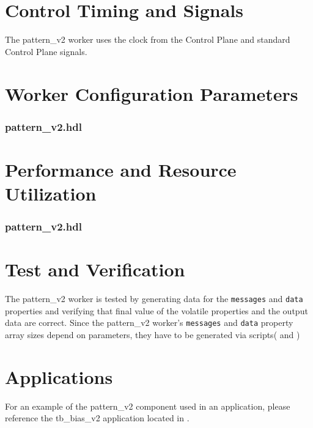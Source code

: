 \documentclass{article}
\def\comp{pattern\_v2}
\edef\ecomp{pattern_v2}
\begin{document}
\section*{Control Timing and Signals}
\begin{flushleft}
The {\comp} worker uses the clock from the Control Plane and standard Control Plane signals.
\end{flushleft}

\begin{landscape}
\section*{Worker Configuration Parameters}
\subsubsection*{\comp.hdl}

\section*{Performance and Resource Utilization}
\subsubsection*{\comp.hdl}

\end{landscape}


\section*{Test and Verification}
\normalsize

\begin{flushleft}

The {\comp} worker is tested by generating data for the \texttt{messages} and \texttt{data} properties and verifying that final value of the volatile properties and the output data are correct. Since the {\comp} worker's \texttt{messages} and \texttt{data} property array sizes depend on parameters, they have to be generated via scripts( and )
\newline


\end{flushleft}

\section*{Applications}
\begin{flushleft}

For an example of the {\comp} component used in an application, please reference the
tb\_bias\_v2 application located in .

\end{flushleft}
\end{document}
